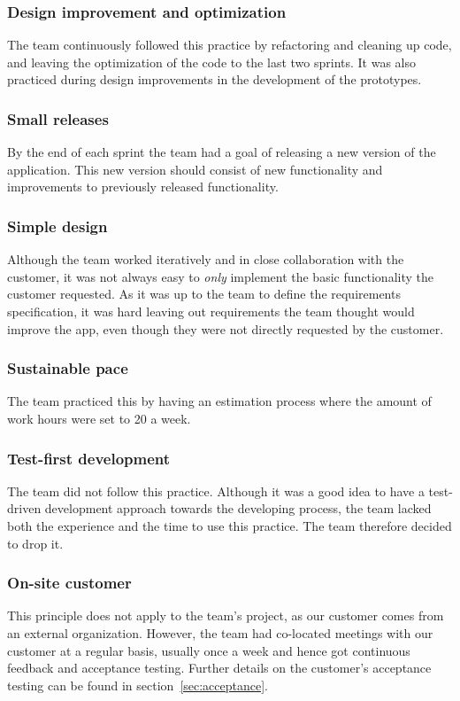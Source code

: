 \subsubsection{Design improvement and optimization}
The team continuously followed this practice by refactoring and cleaning up code, and leaving the optimization of the code to the last two sprints. It was also practiced during design improvements in the development of the prototypes.
 
\subsubsection{Small releases}
By the end of each sprint the team had a goal of releasing a new version of the application. This new version should consist of new functionality and improvements to previously released functionality.

\subsubsection{Simple design}
Although the team worked iteratively and in close collaboration with the customer, it was not always easy to \emph{only} implement the basic functionality the customer requested. As it was up to the team to define the requirements specification, it was hard leaving out requirements the team thought would improve the app, even though they were not directly requested by the customer.

\subsubsection{Sustainable pace}
The team practiced this by having an estimation process where the amount of work hours were set to 20 a week.

\subsubsection{Test-first development}
The team did not follow this practice. Although it was a good idea to have a test-driven development approach towards the developing process, the team lacked both the experience and the time to use this practice. The team therefore decided to drop it.

\subsubsection{On-site customer}
This principle does not apply to the team's project, as our customer comes from an external organization. However, the team had co-located meetings with our customer at a regular basis, usually once a week and hence got continuous feedback and acceptance testing. Further details on the customer's acceptance testing can be found in section~\ref{sec:acceptance}.
